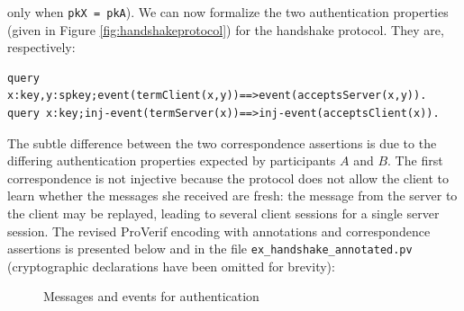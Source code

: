 \documentclass{book}
\newcommand{\A}{A}
\newcommand{\B}{B}
\begin{document}
only when \lstinline!pkX = pkA!).
%
%
We can now formalize the two authentication properties (given in Figure
\ref{fig:handshakeprotocol}) for the handshake protocol. They are, respectively:
\begin{lstlisting}[numbers=none]
query x:key,y:spkey;event(termClient(x,y))==>event(acceptsServer(x,y)).
query x:key;inj-event(termServer(x))==>inj-event(acceptsClient(x)).
\end{lstlisting}
The subtle difference between the two correspondence assertions is due to the differing authentication properties expected by participants $\A$ and $\B$. The first correspondence is not injective because the protocol does not allow the client to learn whether the messages she received are fresh: the message from the server to the client may be replayed, leading to several client sessions for a single server session.
The revised ProVerif encoding with annotations and correspondence assertions is presented below and in the file \texttt{{\docexdir}ex\_handshake\_annotated.pv} (cryptographic declarations have been omitted for brevity):
%

%
\begin{figure}[ht]
\begin{center}
\end{center}
\caption{Messages and events for authentication}
\label{fig:mess_events}
\end{figure}
\end{document}
